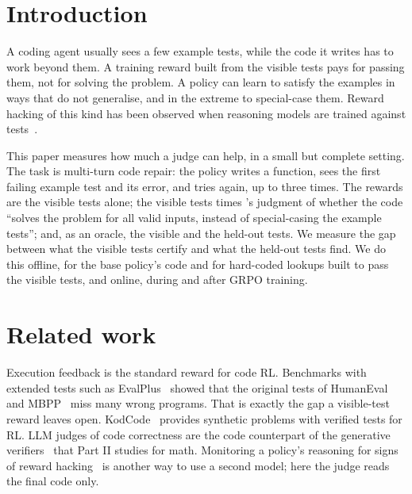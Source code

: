 
\section{Introduction}\label{sec:intro}

A coding agent usually sees a few example tests, while the code it writes has to work beyond them. A training reward
built from the visible tests pays for passing them, not for solving the problem. A policy can learn to satisfy the
examples in ways that do not generalise, and in the extreme to special-case them. Reward hacking of this kind has been
observed when reasoning models are trained against
tests~\cite{baker2025monitoring,denison2024sycophancy,skalse2022defining}.

This paper measures how much a judge can help, in a small but complete setting. The task is multi-turn code repair:
the policy writes a function, sees the first failing example test and its error, and tries again, up to three times. The
rewards are the visible tests alone; the visible tests times \kev{}'s judgment of whether the code ``solves the problem
for all valid inputs, instead of special-casing the example tests''; and, as an oracle, the visible and the held-out
tests. We measure the gap between what the visible tests certify and what the held-out tests find. We do this offline,
for the base policy's code and for hard-coded lookups built to pass the visible tests, and online, during and after
GRPO training.

\section{Related work}\label{sec:related}

Execution feedback is the standard reward for code RL. Benchmarks with extended tests such as EvalPlus~\cite{liu2023evalplus}
showed that the original tests of HumanEval and MBPP~\cite{chen2021codex,austin2021program} miss many wrong programs. That
is exactly the gap a visible-test reward leaves open. KodCode~\cite{xu2025kodcode} provides synthetic problems with
verified tests for RL. LLM judges of code correctness are the code counterpart of the generative
verifiers~\cite{zhang2024genverifier} that Part II studies for math. Monitoring a policy's reasoning for signs of reward
hacking~\cite{baker2025monitoring} is another way to use a second model; here the judge reads the final code only.
